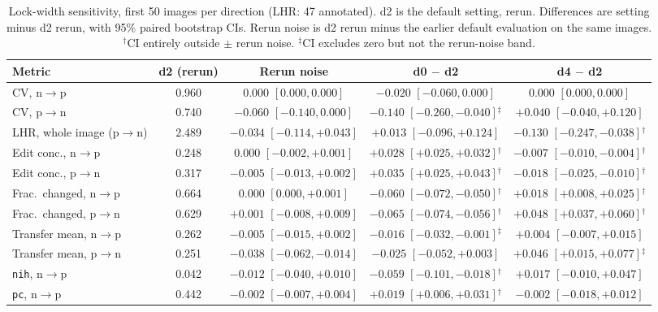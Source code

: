 \begin{table}[t]
\centering
\caption{Lock-width sensitivity, first 50 images per direction (LHR: 47 annotated). d2 is the default setting, rerun. Differences are setting minus d2 rerun, with 95\% paired bootstrap CIs. Rerun noise is d2 rerun minus the earlier default evaluation on the same images. $^{\dagger}$CI entirely outside $\pm$ rerun noise. $^{\ddagger}$CI excludes zero but not the rerun-noise band.}
\label{tab:suppl-lockwidth}
\footnotesize
\begin{tabular}{@{}lcccc@{}}
\toprule
Metric & d2 (rerun) & Rerun noise & d0 $-$ d2 & d4 $-$ d2 \\
\midrule
CV, n$\to$p & 0.960 & $0.000$ $[0.000, 0.000]$ & $-0.020$ $[-0.060, 0.000]$ & $0.000$ $[0.000, 0.000]$ \\
CV, p$\to$n & 0.740 & $-0.060$ $[-0.140, 0.000]$ & $-0.140$ $[-0.260, -0.040]$$^{\ddagger}$ & $+0.040$ $[-0.040, +0.120]$ \\
LHR, whole image (p$\to$n) & 2.489 & $-0.034$ $[-0.114, +0.043]$ & $+0.013$ $[-0.096, +0.124]$ & $-0.130$ $[-0.247, -0.038]$$^{\dagger}$ \\
Edit conc., n$\to$p & 0.248 & $0.000$ $[-0.002, +0.001]$ & $+0.028$ $[+0.025, +0.032]$$^{\dagger}$ & $-0.007$ $[-0.010, -0.004]$$^{\dagger}$ \\
Edit conc., p$\to$n & 0.317 & $-0.005$ $[-0.013, +0.002]$ & $+0.035$ $[+0.025, +0.043]$$^{\dagger}$ & $-0.018$ $[-0.025, -0.010]$$^{\dagger}$ \\
Frac.\ changed, n$\to$p & 0.664 & $0.000$ $[0.000, +0.001]$ & $-0.060$ $[-0.072, -0.050]$$^{\dagger}$ & $+0.018$ $[+0.008, +0.025]$$^{\dagger}$ \\
Frac.\ changed, p$\to$n & 0.629 & $+0.001$ $[-0.008, +0.009]$ & $-0.065$ $[-0.074, -0.056]$$^{\dagger}$ & $+0.048$ $[+0.037, +0.060]$$^{\dagger}$ \\
Transfer mean, n$\to$p & 0.262 & $-0.005$ $[-0.015, +0.002]$ & $-0.016$ $[-0.032, -0.001]$$^{\ddagger}$ & $+0.004$ $[-0.007, +0.015]$ \\
Transfer mean, p$\to$n & 0.251 & $-0.038$ $[-0.062, -0.014]$ & $-0.025$ $[-0.052, +0.003]$ & $+0.046$ $[+0.015, +0.077]$$^{\ddagger}$ \\
\texttt{nih}, n$\to$p & 0.042 & $-0.012$ $[-0.040, +0.010]$ & $-0.059$ $[-0.101, -0.018]$$^{\dagger}$ & $+0.017$ $[-0.010, +0.047]$ \\
\texttt{pc}, n$\to$p & 0.442 & $-0.002$ $[-0.007, +0.004]$ & $+0.019$ $[+0.006, +0.031]$$^{\dagger}$ & $-0.002$ $[-0.018, +0.012]$ \\

\end{tabular}
\end{table}
